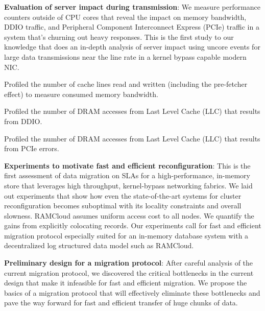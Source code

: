 \begin{myitemize}
    \item{\textbf{Evaluation of server impact during transmission}}: We measure performance counters outside of CPU cores that reveal the impact on memory bandwidth,
     DDIO traffic, and Peripheral Component Interconnect Express (PCIe) traffic in a system that's churning out heavy responses. This is the first study to our knowledge that does an 
     in-depth analysis of server impact using uncore events for large data transmissions near the line rate in a kernel bypass capable modern NIC.
     \begin{myitemize}
     \item Profiled the number of cache lines read and written (including the pre-fetcher effect) to measure consumed memory bandwidth.
     \item Profiled the number of DRAM accesses from Last Level Cache (LLC) that results from DDIO.
     \item Profiled the number of DRAM accesses from Last Level Cache (LLC) that results from PCIe errors.
     \end{myitemize}


  \item{\textbf{Experiments to motivate fast and efficient reconfiguration}}: This is the first assessment of data migration on SLAs for a high-performance,
    in-memory store that leverages high throughput, kernel-bypass networking fabrics. 
   We laid out experiments that show how even the state-of-the-art systems for cluster reconfiguration becomes suboptimal with its locality constraints and overall slowness. 
   RAMCloud assumes uniform access cost to all nodes. We quantify the gains from explicitly colocating records.
   Our experiments call for fast and efficient migration protocol especially suited for an in-memory database system with a decentralized log structured data model such as RAMCloud.

  \item{\textbf{Preliminary design for a migration protocol}}: After careful analysis of the current migration protocol,
   we discovered the critical bottlenecks in the current design that make it infeasible for fast and efficient migration.
   We propose the basics of a \linebreak migration protocol that will effectively eliminate these bottlenecks and pave the way
   forward for fast and efficient transfer of huge chunks of data.

\end{myitemize}

